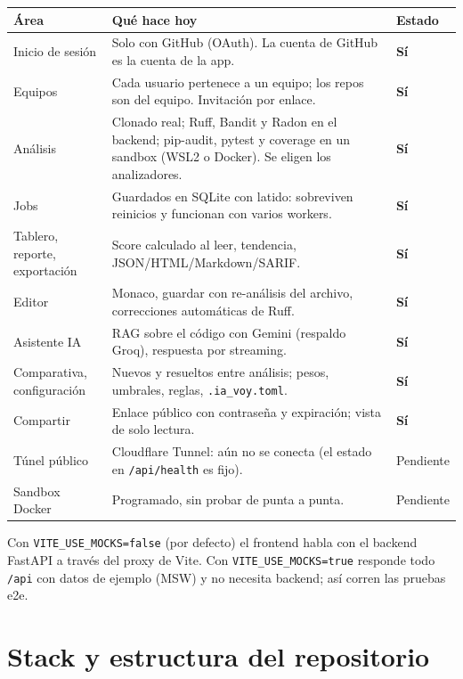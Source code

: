 \documentclass[11pt,a4paper]{article}
\newcommand{\code}[1]{\texttt{\small #1}}
\newcommand{\si}{\textcolor{okgreen}{\textbf{Sí}}}
\newcommand{\pendiente}{\textcolor{muted}{Pendiente}}
\begin{document}
\begin{center}
\begin{tabularx}{\linewidth}{@{}lLl@{}}
\toprule
\textbf{Área} & \textbf{Qué hace hoy} & \textbf{Estado} \\
\midrule
Inicio de sesión & Solo con GitHub (OAuth). La cuenta de GitHub es la cuenta de la app. & \si \\
Equipos & Cada usuario pertenece a un equipo; los repos son del equipo. Invitación por enlace. & \si \\
Análisis & Clonado real; Ruff, Bandit y Radon en el backend; pip-audit, pytest y coverage en un sandbox (WSL2 o Docker). Se eligen los analizadores. & \si \\
Jobs & Guardados en SQLite con latido: sobreviven reinicios y funcionan con varios workers. & \si \\
Tablero, reporte, exportación & Score calculado al leer, tendencia, JSON/HTML/Markdown/SARIF. & \si \\
Editor & Monaco, guardar con re-análisis del archivo, correcciones automáticas de Ruff. & \si \\
Asistente IA & RAG sobre el código con Gemini (respaldo Groq), respuesta por streaming. & \si \\
Comparativa, configuración & Nuevos y resueltos entre análisis; pesos, umbrales, reglas, \code{.ia\_voy.toml}. & \si \\
Compartir & Enlace público con contraseña y expiración; vista de solo lectura. & \si \\
Túnel público & Cloudflare Tunnel: aún no se conecta (el estado en \code{/api/health} es fijo). & \pendiente \\
Sandbox Docker & Programado, sin probar de punta a punta. & \pendiente \\
\bottomrule
\end{tabularx}
\end{center}

\begin{nota}
Con \code{VITE\_USE\_MOCKS=false} (por defecto) el frontend habla con el backend FastAPI a través del proxy de Vite.
Con \code{VITE\_USE\_MOCKS=true} responde todo \code{/api} con datos de ejemplo (MSW) y no necesita backend; así corren
las pruebas e2e.
\end{nota}

\section{Stack y estructura del repositorio}
\end{document}
